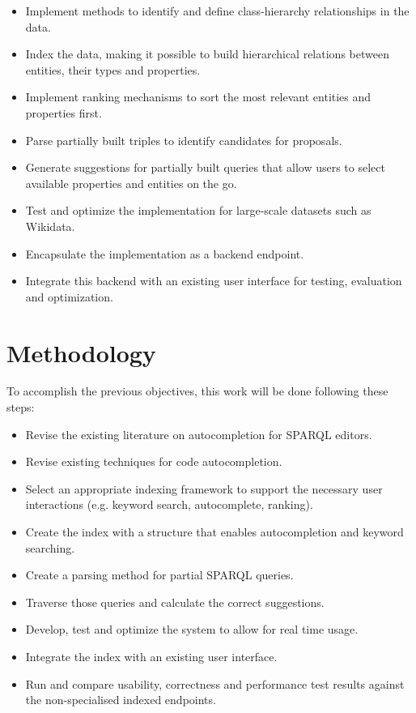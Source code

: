 \begin{itemize}
    \item Implement methods to identify and define class-hierarchy relationships in the data.
    \item Index the data, making it possible to build hierarchical relations between entities, their types and properties.
    \item Implement ranking mechanisms to sort the most relevant entities and properties first.
    \item Parse partially built triples to identify candidates for proposals.
    \item Generate suggestions for partially built queries that allow users to select available properties and entities on the go.
    \item Test and optimize the implementation for large-scale datasets such as Wikidata.
    \item Encapsulate the implementation as a backend endpoint.
    \item Integrate this backend with an existing user interface for testing, evaluation and optimization.
\end{itemize}

\section{Methodology}

To accomplish the previous objectives, this work will be done following these steps:

\begin{itemize}
    \item Revise the existing literature on autocompletion for SPARQL editors.
    \item Revise existing techniques for code autocompletion.
    \item Select an appropriate indexing framework to support the necessary user interactions (e.g. keyword search, autocomplete, ranking).
    \item Create the index with a structure that enables autocompletion and keyword searching.
    \item Create a parsing method for partial SPARQL queries.
    \item Traverse those queries and calculate the correct suggestions.
    \item Develop, test and optimize the system to allow for real time usage.
    \item Integrate the index with an existing user interface.
    \item Run and compare usability, correctness and performance test results against the non-specialised indexed endpoints.
\end{itemize}

